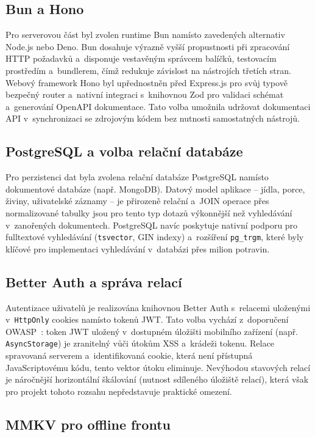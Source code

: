 \subsection{Bun a Hono}

Pro serverovou část byl zvolen runtime Bun namísto zavedených alternativ
Node.js nebo Deno. Bun dosahuje výrazně vyšší propustnosti při zpracování
HTTP požadavků a~disponuje vestavěným správcem balíčků, testovacím
prostředím a~bundlerem, čímž redukuje závislost na nástrojích třetích stran.
Webový framework Hono byl upřednostněn před Express.js pro svůj
typově bezpečný router a~nativní integraci s~knihovnou Zod pro validaci
schémat a~generování OpenAPI dokumentace. Tato volba umožnila udržovat
dokumentaci API v~synchronizaci se zdrojovým kódem bez nutnosti
samostatných nástrojů.

\subsection{PostgreSQL a volba relační databáze}

Pro perzistenci dat byla zvolena relační databáze PostgreSQL namísto
dokumentové databáze (např. MongoDB). Datový model aplikace -- jídla,
porce, živiny, uživatelské záznamy -- je přirozeně relační
a~JOIN operace přes normalizované tabulky jsou pro tento typ dotazů
výkonnější než vyhledávání v~zanořených dokumentech. PostgreSQL navíc
poskytuje nativní podporu pro fulltextové vyhledávání (\texttt{tsvector},
GIN indexy) a~rozšíření \texttt{pg\_trgm}, které byly klíčové pro
implementaci vyhledávání v~databázi přes milion potravin.

\subsection{Better Auth a správa relací}

Autentizace uživatelů je realizována knihovnou Better Auth s~relacemi
uloženými v~\texttt{HttpOnly} cookies namísto tokenů JWT. Tato volba vychází
z~doporučení OWASP~\cite{owasp2024mobile}: token JWT uložený v~dostupném
úložišti mobilního zařízení (např. \texttt{AsyncStorage}) je zranitelný
vůči útokům XSS a~krádeži tokenu. Relace spravovaná serverem a~identifikovaná
cookie, která není přístupná JavaScriptovému kódu, tento vektor útoku
eliminuje. Nevýhodou stavových relací je náročnější horizontální škálování
(nutnost sdíleného úložiště relací), která však pro projekt tohoto rozsahu
nepředstavuje praktické omezení.

\subsection{MMKV pro offline frontu}

